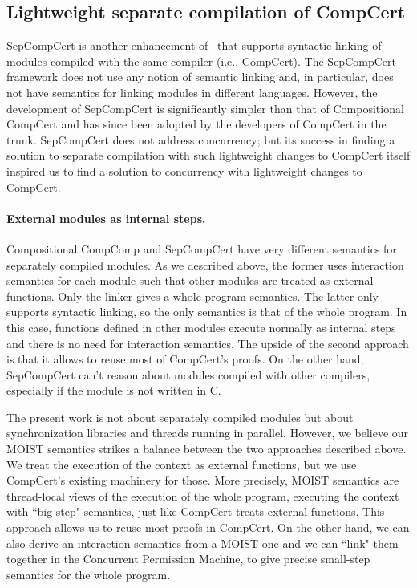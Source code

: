 \subsection*{Lightweight separate compilation of CompCert}

SepCompCert \cite{sepcomp} is another enhancement of \compcert\ that supports syntactic linking of modules compiled with the same compiler (i.e., CompCert). The SepCompCert framework does not use any notion of semantic linking and, in particular, does not have semantics for linking modules in different languages. However, the development of SepCompCert is significantly simpler than that of Compositional CompCert and has since been adopted by the developers of CompCert in the trunk. SepCompCert does not address concurrency; but its success in finding a solution to separate compilation with such lightweight changes to CompCert itself inspired us to find a solution to concurrency with lightweight changes to CompCert.


\paragraph{External modules as internal steps.} Compositional CompComp and SepCompCert  have very different semantics for separately compiled modules. As we described above, the former uses interaction semantics for each module such that other modules are treated as external functions. Only the linker gives a whole-program semantics. The latter only supports syntactic linking, so the only semantics is that of the whole program. In this case, functions defined in other modules execute normally as internal steps and there is no need for interaction semantics. The upside of the second approach is that it allows to reuse most of CompCert's proofs. On the other hand, SepCompCert can't reason about modules compiled with other compilers, especially if the module is not written in C.  

The present work is not about separately compiled modules but about synchronization libraries and threads running in parallel. However, we believe our MOIST semantics strikes a balance between the two approaches described above.  We treat the execution of the context as external functions, but we use CompCert's existing machinery for those. More precisely, MOIST semantics are thread-local views of the execution of the whole program, executing the context with ``big-step" semantics, just like CompCert treats external functions. This approach allows us to reuse most proofs in CompCert. On the other hand, we can also derive an interaction semantics from a MOIST one and we can ``link" them together in the Concurrent Permission Machine, to give precise small-step semantics for the whole program.

